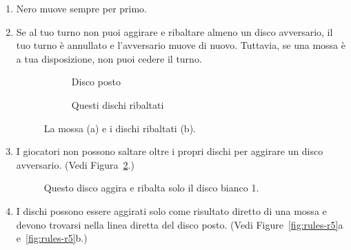 \begin{enumerate}
  \item Nero muove sempre per primo.

  \item Se al tuo turno non puoi aggirare e ribaltare almeno un disco
    avversario, il tuo turno è annullato e l'avversario muove di nuovo.
    Tuttavia, se una mossa è a tua disposizione, non puoi cedere il turno.
    \setcounter{enumi}{3}

    \begin{figure}[htbp]
      \centering
      \begin{subfigure}[b]{0.45\textwidth}
        \centering
        \caption{Disco posto}
      \end{subfigure}
      \hfill
      \begin{subfigure}[b]{0.45\textwidth}
        \centering
        \caption{Questi dischi ribaltati}
      \end{subfigure}
      \caption{La mossa (a) e i dischi ribaltati (b).}
      \label{fig:rules-r2}
    \end{figure}

  \item I giocatori non possono saltare oltre i propri dischi per aggirare
    un disco avversario. (Vedi Figura~\ref{fig:rules-r4}.)

    \begin{figure}[htbp]
      \centering
      \caption{Questo disco aggira e ribalta solo il disco bianco 1.}
      \label{fig:rules-r4}
    \end{figure}

  \item I dischi possono essere aggirati solo come risultato diretto di
    una mossa e devono trovarsi nella linea diretta del disco posto.
    (Vedi Figure~\ref{fig:rules-r5}a e~\ref{fig:rules-r5}b.)


\end{enumerate}
